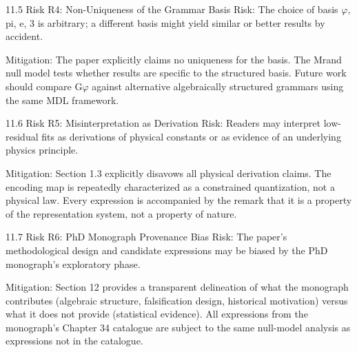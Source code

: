   11.5 Risk R4: Non-Uniqueness of the Grammar Basis
  Risk: The choice of basis {$\varphi$, pi, e, 3} is arbitrary; a different basis might yield similar
  or better results by accident.

  Mitigation: The paper explicitly claims no uniqueness for the basis. The Mrand null
  model tests whether results are specific to the structured basis. Future work should
  compare G$\varphi$ against alternative algebraically structured grammars using the same
  MDL framework.

  11.6 Risk R5: Misinterpretation as Derivation
  Risk: Readers may interpret low-residual fits as derivations of physical constants or as
  evidence of an underlying physics principle.

  Mitigation: Section 1.3 explicitly disavows all physical derivation claims. The encoding
  map is repeatedly characterized as a constrained quantization, not a physical law.
  Every expression is accompanied by the remark that it is a property of the
  representation system, not a property of nature.

  11.7 Risk R6: PhD Monograph Provenance Bias
  Risk: The paper's methodological design and candidate expressions may be biased by
  the PhD monograph's exploratory phase.

  Mitigation: Section 12 provides a transparent delineation of what the monograph
  contributes (algebraic structure, falsification design, historical motivation) versus what
  it does not provide (statistical evidence). All expressions from the monograph's Chapter
  34 catalogue are subject to the same null-model analysis as expressions not in the
  catalogue.

